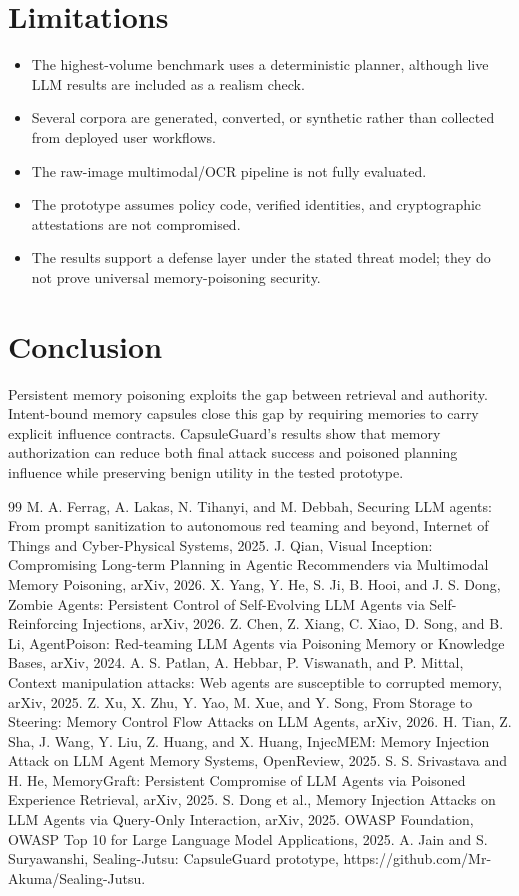 \documentclass[conference]{IEEEtran}
\begin{document}
\section{Limitations}
\begin{itemize}
\item The highest-volume benchmark uses a deterministic planner, although live LLM results are included as a realism check.
\item Several corpora are generated, converted, or synthetic rather than collected from deployed user workflows.
\item The raw-image multimodal/OCR pipeline is not fully evaluated.
\item The prototype assumes policy code, verified identities, and cryptographic attestations are not compromised.
\item The results support a defense layer under the stated threat model; they do not prove universal memory-poisoning security.
\end{itemize}
\section{Conclusion}
Persistent memory poisoning exploits the gap between retrieval and authority. Intent-bound memory capsules close this gap by requiring memories to carry explicit influence contracts. CapsuleGuard's results show that memory authorization can reduce both final attack success and poisoned planning influence while preserving benign utility in the tested prototype.


\begin{thebibliography}{99}
 M. A. Ferrag, A. Lakas, N. Tihanyi, and M. Debbah, Securing LLM agents: From prompt sanitization to autonomous red teaming and beyond, Internet of Things and Cyber-Physical Systems, 2025.
 J. Qian, Visual Inception: Compromising Long-term Planning in Agentic Recommenders via Multimodal Memory Poisoning, arXiv, 2026.
 X. Yang, Y. He, S. Ji, B. Hooi, and J. S. Dong, Zombie Agents: Persistent Control of Self-Evolving LLM Agents via Self-Reinforcing Injections, arXiv, 2026.
 Z. Chen, Z. Xiang, C. Xiao, D. Song, and B. Li, AgentPoison: Red-teaming LLM Agents via Poisoning Memory or Knowledge Bases, arXiv, 2024.
 A. S. Patlan, A. Hebbar, P. Viswanath, and P. Mittal, Context manipulation attacks: Web agents are susceptible to corrupted memory, arXiv, 2025.
 Z. Xu, X. Zhu, Y. Yao, M. Xue, and Y. Song, From Storage to Steering: Memory Control Flow Attacks on LLM Agents, arXiv, 2026.
 H. Tian, Z. Sha, J. Wang, Y. Liu, Z. Huang, and X. Huang, InjecMEM: Memory Injection Attack on LLM Agent Memory Systems, OpenReview, 2025.
 S. S. Srivastava and H. He, MemoryGraft: Persistent Compromise of LLM Agents via Poisoned Experience Retrieval, arXiv, 2025.
 S. Dong et al., Memory Injection Attacks on LLM Agents via Query-Only Interaction, arXiv, 2025.
 OWASP Foundation, OWASP Top 10 for Large Language Model Applications, 2025.
 A. Jain and S. Suryawanshi, Sealing-Jutsu: CapsuleGuard prototype, https://github.com/Mr-Akuma/Sealing-Jutsu.
\end{thebibliography}
\end{document}
